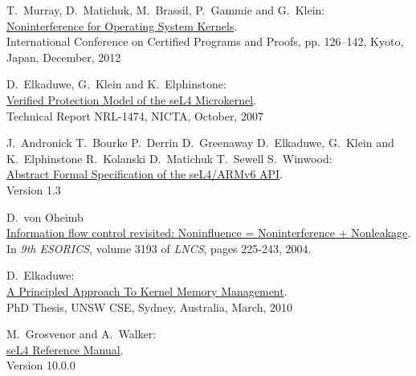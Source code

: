 \documentclass[pdftex,11pt,a4paper]{article}
\begin{document}
	\cleardoublepage
	\begin{thebibliography}{99}

	T.\ Murray, D.\ Matichuk, M.\ Brassil, P.\ Gammie and G.\ Klein:	\\ 
	\href{http://www.ssrg.nicta.com/publications/nicta_full_text/6004.pdf}{%
		Noninterference for Operating System Kernels}. \\
    International Conference on Certified Programs and Proofs, pp. 126–142, Kyoto, Japan, December, 2012

	D.\ Elkaduwe, G.\ Klein and K.\ Elphinstone:	\\ 
	\href{http://ts.data61.csiro.au/publications/nicta_full_text/1474.pdf}{%
		Verified Protection Model of the seL4 Microkernel}. \\
   	Technical Report NRL-1474, NICTA, October, 2007
   	
	J.\ Andronick T.\ Bourke P.\ Derrin D.\ Greenaway D.\ Elkaduwe, G.\ Klein and K.\ Elphinstone R.\ Kolanski D.\ Matichuk T.\ Sewell S.\ Winwood:	\\ 
	\href{https://sel4.systems/Info/Docs/seL4-spec.pdf}{%
		Abstract Formal Specification of the seL4/ARMv6 API}. \\
   	Version 1.3
   	
	D.\ von Oheimb	\\ 
	\href{https://pdfs.semanticscholar.org/21ea/6c722535ed0a22175187796b43c114e14ee8.pdf}{%
		Information flow control revisited: Noninfluence = Noninterference + Nonleakage}. \\
   	In \textit{9th ESORICS}, volume 3193 of \textit{LNCS}, pages 225-243, 2004.
   	
	D.\ Elkaduwe:	\\ 
	\href{https://ts.data61.csiro.au/publications/papers/Elkaduwe:phd.pdf}{%
		A Principled Approach To Kernel Memory Management}. \\
   	PhD Thesis, UNSW CSE, Sydney, Australia, March, 2010

	M.\ Grosvenor and A.\ Walker:	\\ 
	\href{http://sel4.systems/Info/Docs/seL4-manual-latest.pdf}{%
		seL4 Reference Manual}. \\
   	Version 10.0.0
\end{thebibliography}
	
\end{document}
